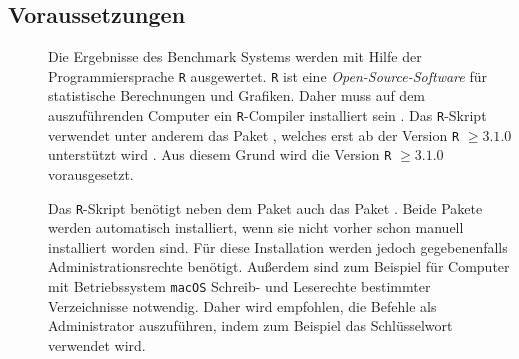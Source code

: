 \subsection{Voraussetzungen}

\begin{description}
	\item[] Die Ergebnisse des Benchmark Systems werden mit Hilfe der Programmiersprache \texttt{R} ausgewertet. \texttt{R} ist eine \emph{Open-Source-Software} für statistische Berechnungen und Grafiken. Daher muss auf dem auszuführenden Computer ein \texttt{R}-Compiler installiert sein \cite{r-project}. Das \texttt{R}-Skript verwendet unter anderem das Paket , welches erst ab der Version \texttt{R} $\geq 3.1.0$ unterstützt wird \cite{rjson}. Aus diesem Grund wird die Version \texttt{R} $\geq 3.1.0$ vorausgesetzt.
	\item[] Das \texttt{R}-Skript benötigt neben dem Paket  auch das Paket  \cite{rcolorbrewer}. Beide Pakete werden automatisch installiert, wenn sie nicht vorher schon manuell installiert worden sind. Für diese Installation werden jedoch gegebenenfalls Administrationsrechte benötigt. Außerdem sind zum Beispiel für Computer mit Betriebssystem \texttt{macOS} Schreib- und Leserechte bestimmter Verzeichnisse notwendig. Daher wird empfohlen, die Befehle als Administrator auszuführen, indem zum Beispiel das Schlüsselwort  verwendet wird.
\end{description}
